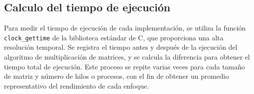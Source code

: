 \subsection{Calculo del tiempo de ejecución}
Para medir el tiempo de ejecución de cada implementación, se utiliza la función \texttt{clock\_gettime} de la biblioteca estándar de C, que proporciona una alta resolución temporal. Se registra el tiempo antes y después de la ejecución del algoritmo de multiplicación de matrices, y se calcula la diferencia para obtener el tiempo total de ejecución. Este proceso se repite varias veces para cada tamaño de matriz y número de hilos o procesos, con el fin de obtener un promedio representativo del rendimiento de cada enfoque. 